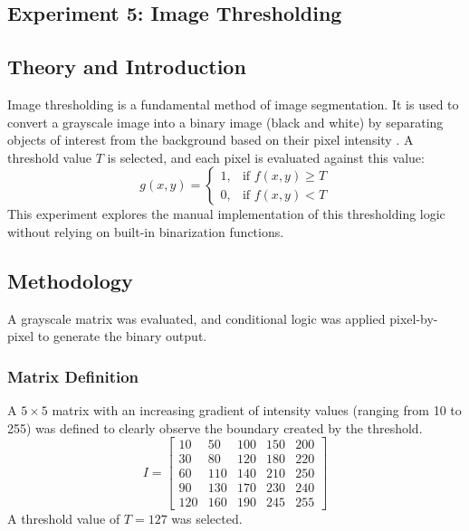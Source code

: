 \documentclass[11pt]{article}
\begin{document}
\captionsetup{justification=centering}


\pagebreak

\tableofcontents
\pagebreak
{}



\begin{center}
    \section{Experiment 5: Image Thresholding}
\end{center}

\subsection{Theory and Introduction}
Image thresholding is a fundamental method of image segmentation. It is used to convert a grayscale image into a binary image (black and white) by separating objects of interest from the background based on their pixel intensity \cite{gonzalez2018}. A threshold value $T$ is selected, and each pixel is evaluated against this value:
$$
    g(x,y) = \begin{cases}
        1, & \text{if } f(x,y) \ge T \\
        0, & \text{if } f(x,y) < T
    \end{cases}
$$
This experiment explores the manual implementation of this thresholding logic without relying on built-in binarization functions.

\subsection{Methodology}
A grayscale matrix was evaluated, and conditional logic was applied pixel-by-pixel to generate the binary output.

\subsubsection{Matrix Definition}
A $5 \times 5$ matrix with an increasing gradient of intensity values (ranging from 10 to 255) was defined to clearly observe the boundary created by the threshold.
$$
    I = \begin{bmatrix}
        10  & 50  & 100 & 150 & 200 \\
        30  & 80  & 120 & 180 & 220 \\
        60  & 110 & 140 & 210 & 250 \\
        90  & 130 & 170 & 230 & 240 \\
        120 & 160 & 190 & 245 & 255
    \end{bmatrix}
$$
A threshold value of $T = 127$ was selected.
\end{document}

